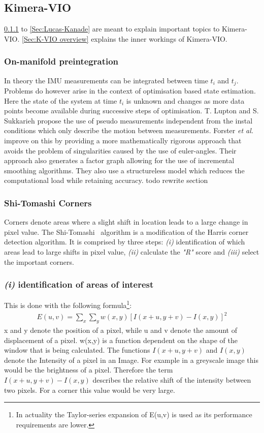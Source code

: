 \documentclass[11pt,a4paper]{article}
\begin{document}
\subsection{Kimera-VIO}
\ref{pre:on-manifold} to \ref{Sec:Lucas-Kanade} are meant to explain important topics to Kimera-VIO.
\ref{Sec:K-VIO overview} explains the inner workings of Kimera-VIO.
\subsubsection{On-manifold preintegration} \label{pre:on-manifold}
In theory the IMU measurements can be integrated between time $t_i$ and $t_j$.
Problems do however arise in the context of optimisation based state estimation. 
Here the state of the system at time $t_i$ is unknown and changes as more data points become available during successive steps of optimisation.
T. Lupton and S. Sukkarieh \cite{preint_lupton} propose the use of pseudo measurements independent from the instal conditions which only describe the motion between measurements.
Forster \textit{et al.} \cite{Forster_2017} improve on this by providing a more mathematically rigorous approach that avoids the problem of singularities caused by the use of euler-angles. 
Their approach also generates a factor graph allowing for the use of incremental smoothing algorithms. 
They also use a structureless model which reduces the computational load while retaining accuracy.
todo rewrite section

\subsubsection{Shi-Tomashi Corners} \label{Sec:Shi-Tomashi}
Corners denote areas where a slight shift in location leads to a large change in pixel value. 
The Shi-Tomashi~\cite{Shi_tomasi} algorithm is a modification of the Harris corner detection algorithm. 
It is comprised by three steps: \emph{(i)} identification of which areas lead to large shifts in pixel value, \emph{(ii)} calculate the \textit{"R"} score and \emph{(iii)} select the important corners.
\subsubsection*{\emph{(i)} identification of areas of interest} 

This is done with the following formula\footnote{In actuality the Taylor-series expansion of E(u,v) is used as its performance requirements are lower.}:
\begin{align}
    E(u,v) = \sum_{x} \sum_y w(x,y) [I(x+u,y+v)- I(x,y)]^2  
\end{align}
x and y denote the position of a pixel, while u and v denote the amount of displacement of a pixel.
w(x,y) is a function dependent on the shape of the window that is being calculated. 
The functions $I(x+u,y+v)$ and $I(x,y)$ denote the Intensity of a pixel in an Image.
For example in a greyscale image this would be the brightness of a pixel.
Therefore the term $I(x+u,y+v)- I(x,y)$ describes the relative shift of the intensity between two pixels. For a corner this value would be very large.
\end{document}
